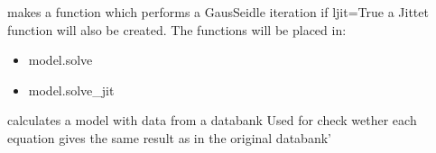 \documentclass[letterpaper,10pt,english]{sphinxmanual}
\begin{document}
\begin{fulllineitems}

\begin{fulllineitems}
\label{\detokenize{index:modelclass.BaseModel.make_res}}
\pysigstartsignatures
{}
\pysigstopsignatures
\sphinxAtStartPar
makes a function which performs a Gaus\sphinxhyphen{}Seidle iteration
if ljit=True a Jittet function will also be created.
The functions will be placed in:
\begin{itemize}
\item {} 
\sphinxAtStartPar
model.solve

\item {} 
\sphinxAtStartPar
model.solve\_jit

\end{itemize}

\end{fulllineitems}


\begin{fulllineitems}
\label{\detokenize{index:modelclass.BaseModel.base_res}}
\pysigstartsignatures
{}
\pysigstopsignatures
\sphinxAtStartPar
calculates a model with data from a databank
Used for check wether each equation gives the same result as in the original databank’

\end{fulllineitems}


\end{fulllineitems}

\end{document}
